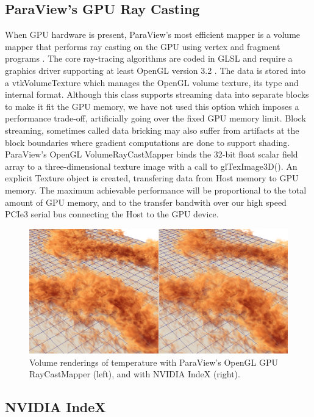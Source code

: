 \documentclass[5p,times]{elsarticle}
\begin{document}
\subsection{ParaView's GPU Ray Casting} \label{smart}

When GPU hardware is present, ParaView's most efficient mapper is a volume
mapper that performs ray casting on the GPU using vertex and fragment programs \cite{KitwareBlog}.
The core ray-tracing algorithms are coded in GLSL and require a graphics driver
supporting at least OpenGL version 3.2 \cite{ShadersInVTK}. The data is stored
into a vtkVolumeTexture which manages the OpenGL volume texture, its type and
internal format. Although this class supports streaming data into separate blocks
to make it fit the GPU memory, we have not used this option which imposes
a performance trade-off, artificially going over the fixed GPU memory limit.
Block streaming, sometimes called data bricking may also suffer from artifacts at
the block boundaries where gradient computations are done to support shading.
ParaView's OpenGL VolumeRayCastMapper binds the 32-bit float scalar field array
to a three-dimensional texture image with a call to glTexImage3D().
An explicit Texture object is created, transfering data from Host memory to GPU memory.
The maximum achievable performance will be proportional to the total amount of GPU memory,
and to the transfer bandwith over our high speed PCIe3 serial bus connecting the Host to the GPU device.

\begin{figure}
	\centering
	\includegraphics[width=\linewidth]{fig2}%
	\caption{\label{fig:gpucloseup} Volume renderings of temperature with ParaView's
OpenGL GPU RayCastMapper (left), and with NVIDIA IndeX (right).}
\end{figure}

\subsection{NVIDIA IndeX} \label{index}
\end{document}
